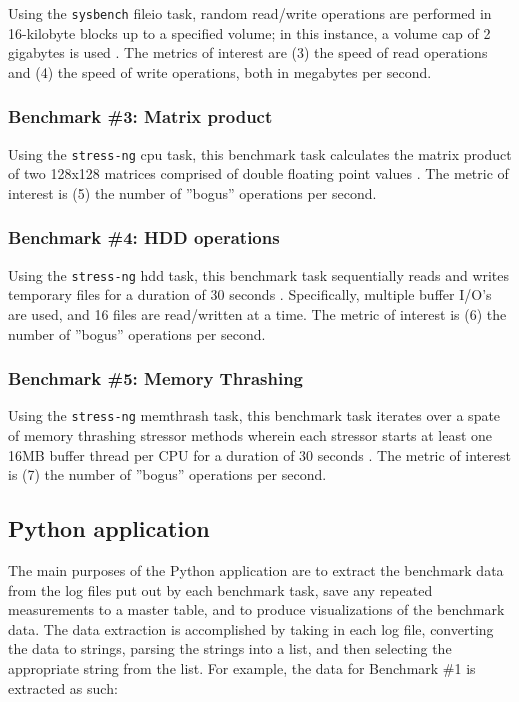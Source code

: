 \documentclass[sigconf]{acmart}
\begin{document}
Using the {\tt sysbench} fileio task, random read/write operations are performed in 16-kilobyte blocks up to a specified volume; in this instance, a volume cap of 2 gigabytes is used \cite{sysbench}. The metrics of interest are (3) the speed of read operations and (4) the speed of write operations, both in megabytes per second.

\subsubsection{Benchmark \#3: Matrix product}

Using the {\tt stress-ng} cpu task, this benchmark task calculates the matrix product of two 128x128 matrices comprised of double floating point values \cite{stressng}. The metric of interest is (5) the number of ''bogus'' operations per second.

\subsubsection{Benchmark \#4: HDD operations}

Using the {\tt stress-ng} hdd task, this benchmark task sequentially reads and writes temporary files for a duration of 30 seconds \cite{stressng}. Specifically, multiple buffer I/O's are used, and 16 files are read/written at a time. The metric of interest is (6) the number of ''bogus'' operations per second.

\subsubsection{Benchmark \#5: Memory Thrashing}

Using the {\tt stress-ng} memthrash task, this benchmark task iterates over a spate of memory thrashing stressor methods wherein each stressor starts at least one 16MB buffer thread per CPU for a duration of 30 seconds  \cite{stressng}. The metric of interest is (7) the number of ''bogus'' operations per second.

\subsection{Python application}

The main purposes of the Python application are to extract the benchmark data from the log files put out by each benchmark task, save any repeated measurements to a master table, and to produce visualizations of the benchmark data. The data extraction is accomplished by taking in each log file, converting the data to strings, parsing the strings into a list, and then selecting the appropriate string from the list. For example, the data for Benchmark \#1 is extracted as such:
\end{document}
